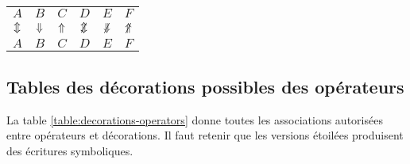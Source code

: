 \documentclass[12pt,a4paper]{article}
\theoremstyle{definition}
\begin{document}
\begin{latexex}
\begin{tabular}{cccccc}
    $A$          & $B$
  & $C$          & $D$
  & $E$          & $F$
  \\
    $\mathrel{\Updownarrow}$      & $\mathrel{\Downarrow}$   
  & $\mathrel{\Uparrow}$  & $\nviff$
  & $\nvimplies$ & $\nvliesimp$
  \\
    $A$          & $B$
  & $C$          & $D$
  & $E$          & $F$
\end{tabular}
\end{latexex}



\subsection{Tables des décorations possibles des opérateurs}

La table \ref{table:decorations-operators}  donne toutes les associations autorisées entre opérateurs et décorations.
Il faut retenir que les versions étoilées produisent des écritures symboliques. 


\end{document}
